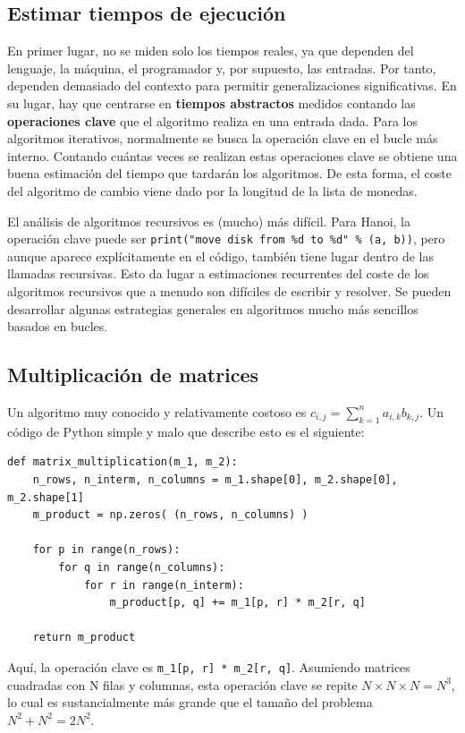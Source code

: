 \subsection{Estimar tiempos de ejecución}
En primer lugar, no se miden solo los tiempos reales, ya que dependen del lenguaje, la máquina, el programador y, por supuesto, las entradas. Por tanto, dependen demasiado del contexto para permitir generalizaciones significativas. En su lugar, hay que centrarse en \textbf{tiempos abstractos} medidos contando las \textbf{operaciones clave} que el algoritmo realiza en una entrada dada. Para los algoritmos iterativos, normalmente se busca la operación clave en el bucle más interno. Contando cuántas veces se realizan estas operaciones clave se obtiene una buena estimación del tiempo que tardarán los algoritmos. De esta forma, el coste del algoritmo de cambio viene dado por la longitud de la lista de monedas.

El análisis de algoritmos recursivos es (mucho) más difícil. Para Hanoi, la operación clave puede ser \texttt{print("move disk from \%d to \%d" \% (a, b))}, pero aunque aparece explícitamente en el código, también tiene lugar dentro de las llamadas recursivas. Esto da lugar a estimaciones recurrentes del coste de los algoritmos recursivos que a menudo son difíciles de escribir y resolver. Se pueden desarrollar algunas estrategias generales en algoritmos mucho más sencillos basados en bucles. 

\subsection{Multiplicación de matrices}
Un algoritmo muy conocido y relativamente costoso es $c_{i,j} = \sum^n_{k=1} a_{i,k}b_{k,j}$. Un código de Python simple y malo que describe esto es el siguiente:
\begin{lstlisting}
def matrix_multiplication(m_1, m_2):
	n_rows, n_interm, n_columns = m_1.shape[0], m_2.shape[0], m_2.shape[1]
	m_product = np.zeros( (n_rows, n_columns) )
	
	for p in range(n_rows):
		for q in range(n_columns):
			for r in range(n_interm):
				m_product[p, q] += m_1[p, r] * m_2[r, q]
				
	return m_product
\end{lstlisting}

Aquí, la operación clave es \texttt{m\_1[p, r] * m\_2[r, q]}. Asumiendo matrices cuadradas con N filas y columnas, esta operación clave se repite $N \times N \times N = N^3$, lo cual es sustancialmente más grande que el tamaño del problema $N^2 + N^2 = 2N^2$.

